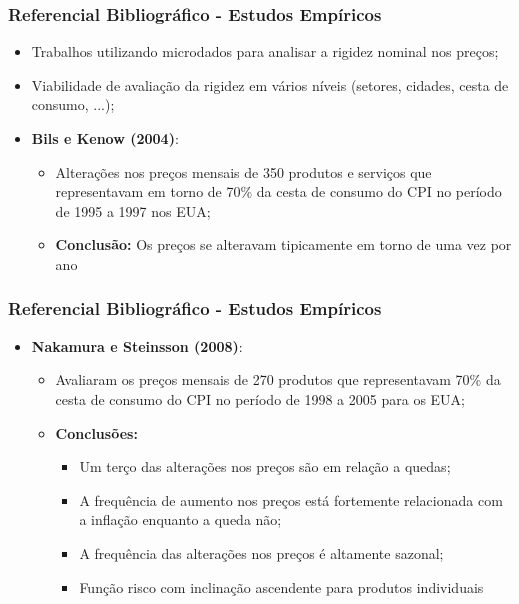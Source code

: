 \documentclass[aspectratio=169]{beamer}
\begin{document}
\begin{frame}\frametitle{Referencial Bibliográfico - Estudos Empíricos}
  \begin{itemize}
  \item Trabalhos utilizando microdados para analisar a rigidez nominal nos preços;
  \item Viabilidade de avaliação da rigidez em vários níveis (setores, cidades, cesta de consumo, ...);
  \item \textbf{Bils e Kenow (2004)}:
    \begin{itemize}
    \item Alterações nos preços mensais de 350 produtos e serviços que representavam em torno de 70\% da cesta de consumo do CPI no período de 1995 a 1997 nos EUA;
    \item \textbf{Conclusão:} Os preços se alteravam tipicamente em torno de uma vez por ano
    \end{itemize}
  \end{itemize}
\end{frame}

\begin{frame}\frametitle{Referencial Bibliográfico - Estudos Empíricos}
  \begin{itemize}
  \item \textbf{Nakamura e Steinsson (2008)}:
    \begin{itemize}
    \item Avaliaram os preços mensais de 270 produtos que representavam 70\% da cesta de consumo do CPI no período de 1998 a 2005 para os EUA;
    \item \textbf{Conclusões:} 
      \begin{itemize}
      \item Um terço das alterações nos preços são em relação a quedas;
      \item A frequência de aumento nos preços está fortemente relacionada com a inflação enquanto a queda não;
      \item A frequência das alterações nos preços é altamente sazonal;
      \item Função risco com inclinação ascendente para produtos individuais
      \end{itemize}
    \end{itemize}
  \end{itemize}
\end{frame}
\end{document}
